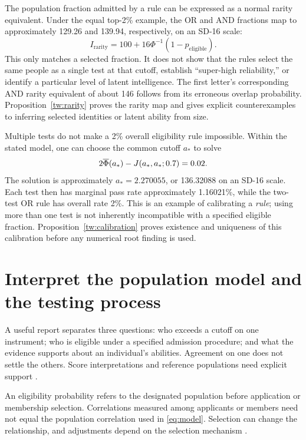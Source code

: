 The population fraction admitted by a rule can be expressed as a normal
rarity equivalent. Under the equal top-2\% example, the OR and AND fractions
map to approximately 129.26 and 139.94, respectively, on an SD-16 scale:
\begin{equation}
I_{\mathrm{rarity}}=100+16\Phi^{-1}(1-p_{\mathrm{eligible}}).
\label{eq:rarity}
\end{equation}
This only matches a selected fraction. It does not show that the rules
select the same people as a single test at that cutoff, establish
``super-high reliability,'' or identify a particular level of latent
intelligence. The first letter's corresponding AND rarity equivalent
of about 146 follows from its erroneous overlap probability.
Proposition~\ref{tw:rarity} proves the rarity map and gives explicit
counterexamples to inferring selected identities or latent ability from size.

Multiple tests do not make a 2\% overall eligibility rule impossible.
Within the stated model, one can choose the common cutoff \(a_*\) to solve
\begin{equation}
2\overline{\Phi}(a_*)-J(a_*,a_*;0.7)=0.02.
\label{eq:calibration}
\end{equation}
The solution is approximately \(a_*=2.270055\), or 136.32088 on an SD-16
scale. Each test then has marginal pass rate approximately 1.16021\%,
while the two-test OR rule has overall rate 2\%. This is an example of
calibrating a \emph{rule}; using more than one test is not inherently
incompatible with a specified eligible fraction.
Proposition~\ref{tw:calibration} proves existence and uniqueness of this
calibration before any numerical root finding is used.

\section{Interpret the population model and the testing process}

A useful report separates three questions: who exceeds a cutoff on one
instrument; who is eligible under a specified admission procedure; and
what the evidence supports about an individual's abilities. Agreement
on one does not settle the others. Score interpretations and reference
populations need explicit support
\citep[Standards~1.1--1.4 and 5.8--5.9]{standards2014}.

An eligibility probability refers to the designated population before
application or membership selection. Correlations measured among applicants
or members need not equal the population correlation used in
\cref{eq:model}. Selection can change the relationship, and adjustments
depend on the selection mechanism \citep{sackett2000}.

